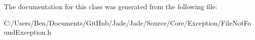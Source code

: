 The documentation for this class was generated from the following file\+:\begin{DoxyCompactItemize}
\item 
C\+:/\+Users/\+Ben/\+Documents/\+Git\+Hub/\+Jade/\+Jade/\+Source/\+Core/\+Exception/File\+Not\+Found\+Exception.\+h\end{DoxyCompactItemize}
